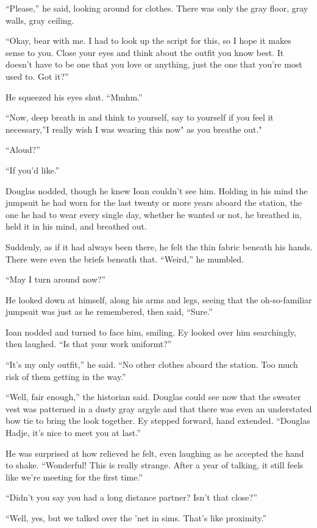 ``Please,'' he said, looking around for clothes. There was only the gray floor, gray walls, gray ceiling.

``Okay, bear with me. I had to look up the script for this, so I hope it makes sense to you. Close your eyes and think about the outfit you know best. It doesn't have to be one that you love or anything, just the one that you're most used to. Got it?''

He squeezed his eyes shut. ``Mmhm.''

``Now, deep breath in and think to yourself, say to yourself if you feel it necessary,''I really wish I was wearing this now" as you breathe out."

``Aloud?''

``If you'd like.''

Douglas nodded, though he knew Ioan couldn't see him. Holding in his mind the jumpsuit he had worn for the last twenty or more years aboard the station, the one he had to wear every single day, whether he wanted or not, he breathed in, held it in his mind, and breathed out.

Suddenly, as if it had always been there, he felt the thin fabric beneath his hands. There were even the briefs beneath that. ``Weird,'' he mumbled.

``May I turn around now?''

He looked down at himself, along his arms and legs, seeing that the oh-so-familiar jumpsuit was just as he remembered, then said, ``Sure.''

Ioan nodded and turned to face him, smiling. Ey looked over him searchingly, then laughed. ``Is that your work uniformt?''

``It's my only outfit,'' he said. ``No other clothes aboard the station. Too much risk of them getting in the way.''

``Well, fair enough,'' the historian said. Douglas could see now that the sweater vest was patterned in a dusty gray argyle and that there was even an understated bow tie to bring the look together. Ey stepped forward, hand extended. ``Douglas Hadje, it's nice to meet you at last.''

He was surprised at how relieved he felt, even laughing as he accepted the hand to shake. ``Wonderful! This is really strange. After a year of talking, it still feels like we're meeting for the first time.''

``Didn't you say you had a long distance partner? Isn't that close?''

``Well, yes, but we talked over the 'net in sims. That's like proximity.''

